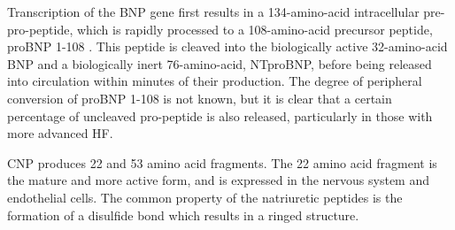 \documentclass[14pt,a4paper,onecolumn]{extarticle}
\begin{document}



Transcription of the BNP gene first results in a 134-amino-acid intracellular pre-pro-peptide, which is rapidly processed to a 108-amino-acid precursor peptide, proBNP 1-108 . This peptide is cleaved into the biologically active 32-amino-acid BNP and a biologically inert 76-amino-acid, NTproBNP, before being released into circulation within minutes of their production. The degree of peripheral conversion of proBNP 1-108 is not known, but it is clear that a certain percentage of uncleaved pro-peptide is also released, particularly in those with more advanced HF. \citep{Gaggin2014}

CNP produces 22 and 53 amino acid fragments. The 22 amino acid fragment is the mature and more active form, and is expressed in the nervous system and endothelial cells. The common property of the natriuretic peptides is the formation of a disulfide bond which results in a ringed structure.\citep{Suzuki2001}
\end{document}
